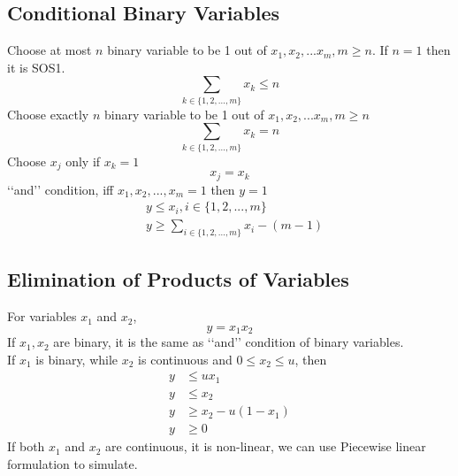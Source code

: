 			\subsection{Conditional Binary Variables}
				 Choose at most $n$ binary variable to be 1 out of  $x_1, x_2, ... x_m, m\ge n$. If $n=1$ then it is SOS1.\\
				\begin{equation}
					\sum_{k\in \{1,2,...,m\}} x_k \le n\nonumber
				\end{equation}
				 Choose exactly $n$ binary variable to be 1 out of  $x_1, x_2, ... x_m, m\ge n$\\
				\begin{equation}
					\sum_{k\in \{1,2,...,m\}} x_k = n\nonumber
				\end{equation}
				 Choose $x_j$ only if $x_k = 1$\\
				\begin{equation}x_j = x_k \nonumber \end{equation}
				 \lq\lq{}and\rq\rq{} condition, iff $x_1, x_2, ... , x_m =1$ then $y=1$\\
				\begin{align}
					& y \le x_i, i\in \{1, 2, ..., m\} \nonumber \\
					& y \ge \sum_{i \in \{1, 2, ..., m\}} x_i - (m - 1) \nonumber
				\end{align}

			\subsection{Elimination of Products of Variables}
				 For variables $x_1$ and $x_2$,
				\begin{equation}y = x_1 x_2\nonumber\end{equation}
				 If $x_1, x_2$ are binary, it is the same as \lq\lq{}and\rq\rq{} condition of binary variables.\\
				If $x_1$ is binary, while $x_2$ is continuous and $0 \le x_2 \le u$, then
				\begin{align}
					y &\le ux_1 \nonumber \\
					y &\le x_2 \nonumber \\
					y &\ge x_2 - u(1- x_1) \nonumber \\
					y &\ge 0 \nonumber
				\end{align}
				If both $x_1$ and $x_2$ are continuous, it is non-linear, we can use Piecewise linear formulation to simulate.

